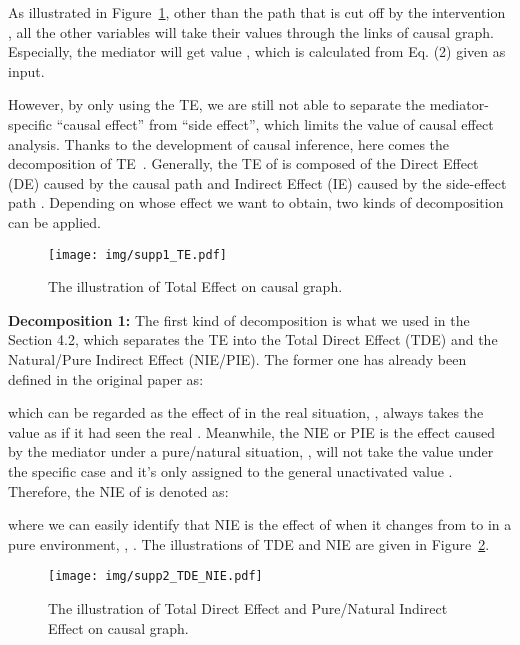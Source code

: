 \documentclass[10pt,twocolumn,letterpaper]{article}
\begin{document}
As illustrated in Figure~\ref{supp_fig:te}, other than the path  that is cut off by the intervention , all the other variables will take their values through the links of causal graph. Especially, the mediator  will get value , which is calculated from Eq. (2) given  as input.

However, by only using the TE, we are still not able to separate the mediator-specific ``causal effect'' from ``side effect'', which limits the value of causal effect analysis. Thanks to the development of causal inference, here comes the decomposition of TE~\cite{pearl2001direct, vanderweele2013three}. Generally, the TE of  is composed of the Direct Effect (DE) caused by the causal path  and Indirect Effect (IE) caused by the side-effect path . Depending on whose effect we want to obtain, two kinds of decomposition can be applied. 


\begin{figure}[t!]
   \begin{minipage}[b]{1\linewidth}
   \centerline{\texttt{[image: img/supp1\_TE.pdf]}}
   \end{minipage}
   \caption{The illustration of Total Effect on causal graph.}
   \label{supp_fig:te} \end{figure}


\noindent\textbf{Decomposition 1:} The first kind of decomposition is what we used in the Section 4.2, which separates the TE into the Total Direct Effect (TDE) and the Natural/Pure Indirect Effect (NIE/PIE). The former one has already been defined in the original paper as:

which can be regarded as the effect of  in the real situation, \ie,  always takes the value  as if it had seen the real . Meanwhile, the NIE or PIE is the effect caused by the mediator  under a pure/natural situation, \ie,  will not take the value  under the specific case and it's only assigned to the general unactivated value . Therefore, the NIE of  is denoted as:

where we can easily identify that NIE is the effect of  when it changes from  to  in a pure environment, \ie, . The illustrations of TDE and NIE are given in Figure~\ref{supp_fig:tde_nie}. 

\begin{figure}[t!]
   \begin{minipage}[b]{1\linewidth}
   \centerline{\texttt{[image: img/supp2\_TDE\_NIE.pdf]}}
   \end{minipage}
   \caption{The illustration of Total Direct Effect and Pure/Natural Indirect Effect on causal graph.}
   \label{supp_fig:tde_nie} \end{figure}
\end{document}

